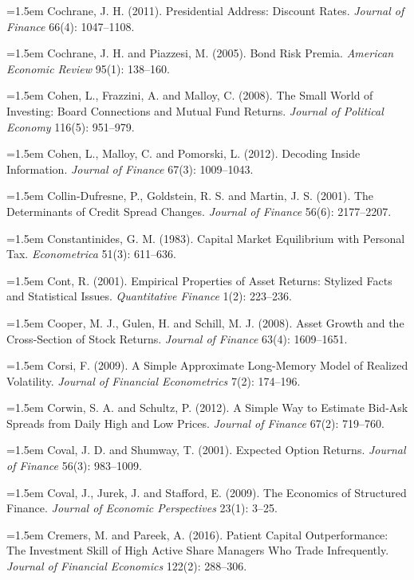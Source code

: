 \hangindent=1.5em Cochrane, J. H. (2011). Presidential Address: Discount Rates. \emph{Journal of Finance} 66(4): 1047--1108.

\hangindent=1.5em Cochrane, J. H. and Piazzesi, M. (2005). Bond Risk Premia. \emph{American Economic Review} 95(1): 138--160.

\hangindent=1.5em Cohen, L., Frazzini, A. and Malloy, C. (2008). The Small World of Investing: Board Connections and Mutual Fund Returns. \emph{Journal of Political Economy} 116(5): 951--979.

\hangindent=1.5em Cohen, L., Malloy, C. and Pomorski, L. (2012). Decoding Inside Information. \emph{Journal of Finance} 67(3): 1009--1043.

\hangindent=1.5em Collin-Dufresne, P., Goldstein, R. S. and Martin, J. S. (2001). The Determinants of Credit Spread Changes. \emph{Journal of Finance} 56(6): 2177--2207.

\hangindent=1.5em Constantinides, G. M. (1983). Capital Market Equilibrium with Personal Tax. \emph{Econometrica} 51(3): 611--636.

\hangindent=1.5em Cont, R. (2001). Empirical Properties of Asset Returns: Stylized Facts and Statistical Issues. \emph{Quantitative Finance} 1(2): 223--236.

\hangindent=1.5em Cooper, M. J., Gulen, H. and Schill, M. J. (2008). Asset Growth and the Cross-Section of Stock Returns. \emph{Journal of Finance} 63(4): 1609--1651.

\hangindent=1.5em Corsi, F. (2009). A Simple Approximate Long-Memory Model of Realized Volatility. \emph{Journal of Financial Econometrics} 7(2): 174--196.

\hangindent=1.5em Corwin, S. A. and Schultz, P. (2012). A Simple Way to Estimate Bid-Ask Spreads from Daily High and Low Prices. \emph{Journal of Finance} 67(2): 719--760.

\hangindent=1.5em Coval, J. D. and Shumway, T. (2001). Expected Option Returns. \emph{Journal of Finance} 56(3): 983--1009.

\hangindent=1.5em Coval, J., Jurek, J. and Stafford, E. (2009). The Economics of Structured Finance. \emph{Journal of Economic Perspectives} 23(1): 3--25.

\hangindent=1.5em Cremers, M. and Pareek, A. (2016). Patient Capital Outperformance: The Investment Skill of High Active Share Managers Who Trade Infrequently. \emph{Journal of Financial Economics} 122(2): 288--306.

